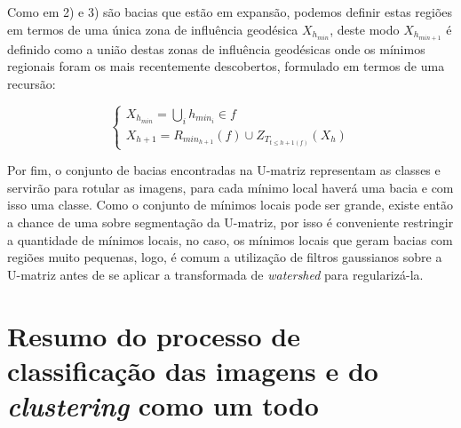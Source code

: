 Como em 2) e 3) são bacias que estão em expansão, podemos definir estas regiões em termos
de uma única zona de influência geodésica $ X_{h_{min}} $, deste modo
$ X_{h_{min + 1}} $ é definido como a união destas zonas de influência geodésicas
onde os mínimos regionais foram os mais recentemente descobertos,
formulado em termos de uma recursão:

\begin{equation}\label{eq:watershed_recursao}
  \left\{
    \begin{array}{l}
      X_{h_{min}} = \bigcup_i h_{min_{i}} \in f \\
      X_{h + 1} = R_{min_{h + 1}}(f) \cup Z_{T_{t \le {h + 1}(f)}}(X_h)
    \end{array}
  \right.
\end{equation}

Por fim, o conjunto de bacias encontradas na U-matriz representam as classes e
servirão para rotular as imagens, para cada mínimo local haverá uma bacia e com
isso uma classe. Como o conjunto de mínimos locais pode ser grande, existe então
a chance de uma sobre segmentação da U-matriz, por isso é conveniente restringir
a quantidade de mínimos locais, no caso, os mínimos locais que geram bacias
com regiões muito pequenas, logo, é comum a utilização de filtros gaussianos
sobre a U-matriz antes de se aplicar a transformada de \textit{watershed} para
regularizá-la.

\section{Resumo do processo de classificação das imagens e do \textit{clustering}
como um todo}\label{sec:resumo_clustering}
